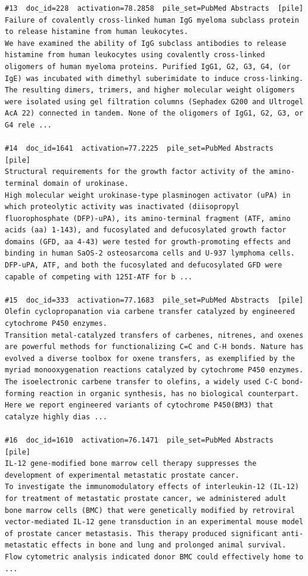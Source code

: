 \begin{verbatim}
#13  doc_id=228  activation=78.2858  pile_set=PubMed Abstracts  [pile]
Failure of covalently cross-linked human IgG myeloma subclass protein to release histamine from human leukocytes.
We have examined the ability of IgG subclass antibodies to release histamine from human leukocytes using covalently cross-linked oligomers of human myeloma proteins. Purified IgG1, G2, G3, G4, (or IgE) was incubated with dimethyl suberimidate to induce cross-linking. The resulting dimers, trimers, and higher molecular weight oligomers were isolated using gel filtration columns (Sephadex G200 and Ultrogel AcA 22) connected in tandem. None of the oligomers of IgG1, G2, G3, or G4 rele ...

#14  doc_id=1641  activation=77.2225  pile_set=PubMed Abstracts  [pile]
Structural requirements for the growth factor activity of the amino-terminal domain of urokinase.
High molecular weight urokinase-type plasminogen activator (uPA) in which proteolytic activity was inactivated (diisopropyl fluorophosphate (DFP)-uPA), its amino-terminal fragment (ATF, amino acids (aa) 1-143), and fucosylated and defucosylated growth factor domains (GFD, aa 4-43) were tested for growth-promoting effects and binding in human SaOS-2 osteosarcoma cells and U-937 lymphoma cells. DFP-uPA, ATF, and both the fucosylated and defucosylated GFD were capable of competing with 125I-ATF for b ...

#15  doc_id=333  activation=77.1683  pile_set=PubMed Abstracts  [pile]
Olefin cyclopropanation via carbene transfer catalyzed by engineered cytochrome P450 enzymes.
Transition metal-catalyzed transfers of carbenes, nitrenes, and oxenes are powerful methods for functionalizing C=C and C-H bonds. Nature has evolved a diverse toolbox for oxene transfers, as exemplified by the myriad monooxygenation reactions catalyzed by cytochrome P450 enzymes. The isoelectronic carbene transfer to olefins, a widely used C-C bond-forming reaction in organic synthesis, has no biological counterpart. Here we report engineered variants of cytochrome P450(BM3) that catalyze highly dias ...

#16  doc_id=1610  activation=76.1471  pile_set=PubMed Abstracts  [pile]
IL-12 gene-modified bone marrow cell therapy suppresses the development of experimental metastatic prostate cancer.
To investigate the immunomodulatory effects of interleukin-12 (IL-12) for treatment of metastatic prostate cancer, we administered adult bone marrow cells (BMC) that were genetically modified by retroviral vector-mediated IL-12 gene transduction in an experimental mouse model of prostate cancer metastasis. This therapy produced significant anti-metastatic effects in bone and lung and prolonged animal survival. Flow cytometric analysis indicated donor BMC could effectively home to ...


\end{verbatim}
